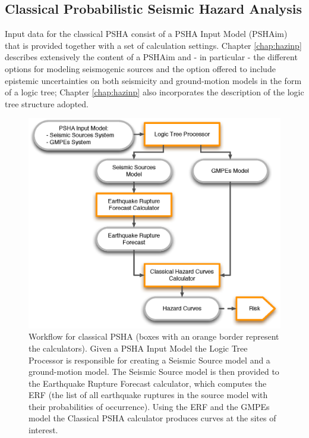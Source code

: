 \subsection{Classical Probabilistic Seismic Hazard Analysis}
\label{section:classicalPSHA}
%
Input data for the classical PSHA consist of a PSHA Input Model (PSHAim) that 
is provided together with a set of calculation settings. 
%
Chapter \ref{chap:hazinp} describes extensively the content of a PSHAim and 
- in particular - the different options for modeling seismogenic sources 
and the option offered to include epistemic uncertainties on both seismicity 
and ground-motion models in the form of a logic tree; Chapter 
\ref{chap:hazinp} also incorporates the description of the logic tree 
structure adopted.
%
\begin{figure}[htbp]
\begin{center}
\includegraphics[width=14cm]{./Figures/Part_Hazard/classical_psha_workflow.eps}
\caption{Workflow for classical PSHA (boxes with an orange border represent the 
calculators). Given a PSHA Input Model 
the Logic Tree Processor is responsible for creating a Seismic Source model
and a ground-motion model. 
The Seismic Source model is then provided to the Earthquake Rupture Forecast 
calculator, which computes the ERF (the list of all earthquake ruptures in the 
source model with their probabilities of occurrence). 
Using the ERF and the GMPEs model the Classical PSHA calculator produces 
curves at the sites of interest.}
\label{classical_psha_workflow}
\end{center}
\end{figure}

